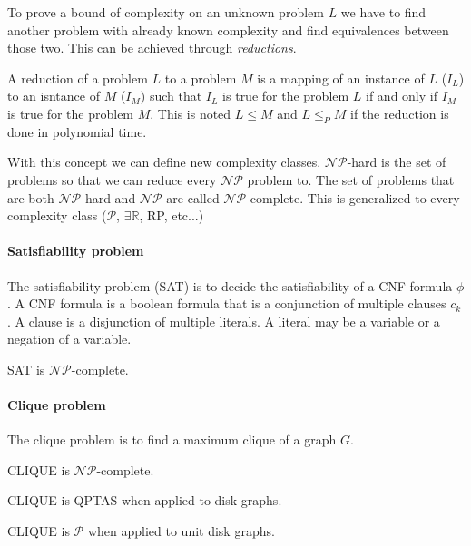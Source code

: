 To prove a bound of complexity on an unknown problem $L$ we have to find another
problem with already known complexity and find equivalences between those two. This
can be achieved through \textit{reductions}.

\begin{defn}
  A reduction of a problem $L$ to a problem $M$ is a mapping of an instance of $L$ ($I_L$)
  to an isntance of $M$ ($I_M$) such that $I_L$ is true for the problem $L$ if and
  only if $I_M$ is true for the problem $M$. This is noted $L \leq M$ and $L \leq_P M$
  if the reduction is done in polynomial time.
\end{defn}

With this concept we can define new complexity classes. $\mathcal{NP}$-hard is
the set of problems so that we can reduce every $\mathcal{NP}$ problem to. The set
of problems that are both $\mathcal{NP}$-hard and $\mathcal{NP}$ are called $\mathcal{NP}$-complete.
This is generalized to every complexity class ($\mathcal{P}$, $\exists \mathbb{R}$, RP, etc...)

\paragraph{Satisfiability problem} The satisfiability problem (SAT) is to decide the satisfiability
of a CNF formula $\phi$. A CNF formula is a boolean formula that is a conjunction of multiple
clauses $c_k$. A clause is a disjunction of multiple literals. A literal may be a variable
or a negation of a variable.

\begin{theorem}
  SAT is $\mathcal{NP}$-complete.
\end{theorem}

\paragraph{Clique problem} The clique problem is to find a maximum clique of a graph
$G$.

\begin{theorem}
  CLIQUE is $\mathcal{NP}$-complete. \cite{Karp1972}
\end{theorem}

\begin{theorem}
  CLIQUE is QPTAS when applied to disk graphs. \cite{DBLP:journals/corr/abs-1712-05010}
\end{theorem}

\begin{theorem}
  CLIQUE is $\mathcal{P}$ when applied to unit disk graphs. \cite{CLARK1990165}
\end{theorem}

